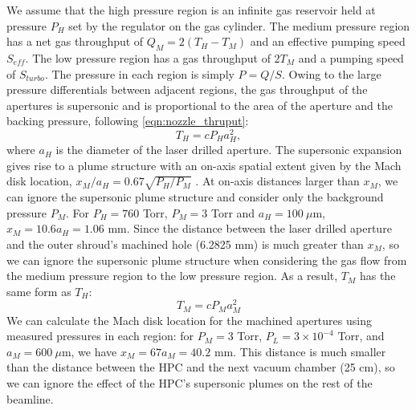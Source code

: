 We assume that the high pressure region is an infinite gas reservoir held at pressure $P_H$ set by the regulator on the gas cylinder. The medium pressure region has a net gas throughput of $Q_M = 2(T_H - T_M)$ and an effective pumping speed $S_{eff}$. The low pressure region has a gas throughput of $2T_M$ and a pumping speed of $S_{turbo}$. The pressure in each region is simply $P = Q / S$. Owing to the large pressure differentials between adjacent regions, the gas throughput of the apertures is supersonic and is proportional to the area of the aperture and the backing pressure, following \cref{eqn:nozzle_thruput}:
\begin{equation}
T_H = c P_H a_H^2,
\end{equation}
where $a_H$ is the diameter of the laser drilled aperture. The supersonic expansion gives rise to a plume structure with an on-axis spatial extent given by the Mach disk location, $x_M / a_H = 0.67 \sqrt{P_H/P_M}$ \cite{millerFreeJetSources1988}. At on-axis distances larger than $x_M$, we can ignore the supersonic plume structure and consider only the background pressure $P_M$. For $P_H = 760$ Torr, $P_M = 3$ Torr and $a_H = 100 \ \mu$m, $x_M = 10.6 a_H = 1.06$ mm. Since the distance between the laser drilled aperture and the outer shroud's machined hole (6.2825 mm) is much greater than $x_M$, so we can ignore the supersonic plume structure when considering the gas flow from the medium pressure region to the low pressure region. As a result, $T_M$ has the same form as $T_H$:
\begin{equation}
T_M = c P_M a_M^2
\end{equation}
We can calculate the Mach disk location for the machined apertures using measured pressures in each region: for $P_M = 3$ Torr, $P_L = 3 \times 10^{-4}$ Torr, and $a_M = 600 \ \mu$m, we have $x_M = 67 a_M = 40.2$ mm. This distance is much smaller than the distance between the HPC and the next vacuum chamber (25 cm), so we can ignore the effect of the HPC's supersonic plumes on the rest of the beamline.

